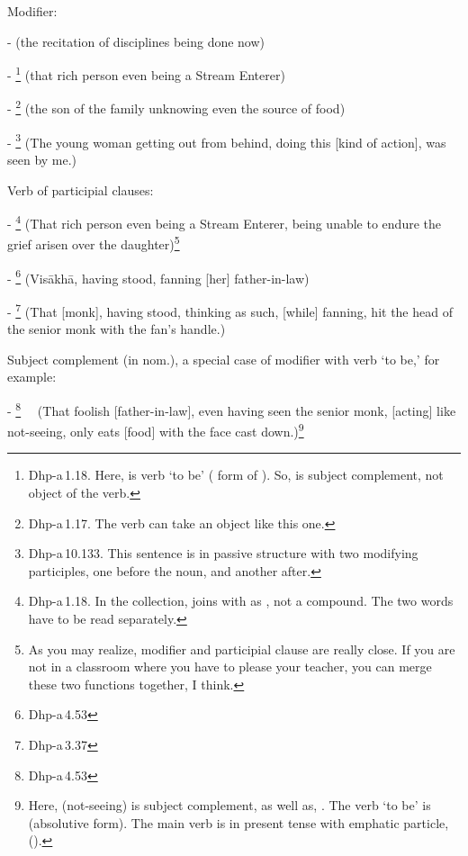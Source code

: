 \begin{compactenum}[(1)]
\item Modifier:\par
-  (the recitation of disciplines being done now)\par
- \footnote{Dhp-a\,1.18. Here,  is verb `to be' ( form of ). So,  is subject complement, not object of the verb.} (that rich person even being a Stream Enterer)\par
- \footnote{Dhp-a\,1.17. The verb can take an object like this one.} (the son of the family unknowing even the source of food)\par
- \footnote{Dhp-a\,10.133. This sentence is in passive structure with two modifying participles, one before the noun, and another after.} (The young woman getting out from behind, doing this [kind of action], was seen by me.)\par

\item Verb of participial clauses:\par
- \footnote{Dhp-a\,1.18. In the collection,  joins with  as , not a compound. The two words have to be read separately.} (That rich person even being a Stream Enterer, being unable to endure the grief arisen over the daughter)\footnote{As you may realize, modifier and participial clause are really close. If you are not in a classroom where you have to please your teacher, you can merge these two functions together, I think.}\par
- \footnote{Dhp-a\,4.53} (Vis\=akh\=a, having stood, fanning [her] father-in-law)\par
- \footnote{Dhp-a\,3.37} (That [monk], having stood, thinking as such, [while] fanning, hit the head of the senior monk with the fan's handle.)\par

\item Subject complement (in nom.), a special case of modifier with verb `to be,' for example:\par
- \footnote{Dhp-a\,4.53} \ \ (That foolish [father-in-law], even having seen the senior monk, [acting] like not-seeing, only eats [food] with the face cast down.)\footnote{Here,  (not-seeing) is subject complement, as well as, . The verb `to be' is  (absolutive form). The main verb is in present tense with emphatic particle,  ().}\par


\end{compactenum}
